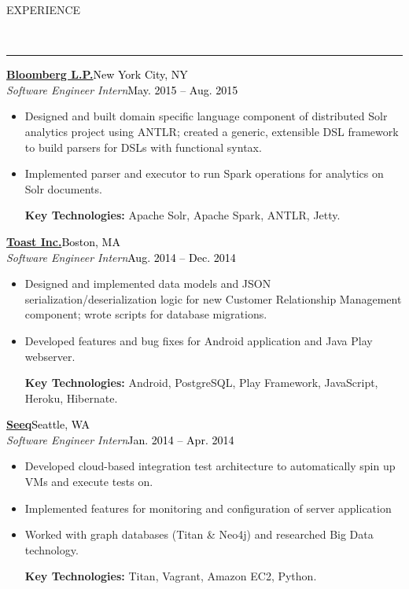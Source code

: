 \documentclass[11pt, letterpaper, oneside]{article}
\newcommand{\HRule}[2]{\textcolor{#1}{\rule{\linewidth}{#2}}}
\newcommand{\sectiontitle}[1]{\begin{minipage}{\textwidth}\vspace{-7.5pt}\begin{flushleft}\hspace{-20.5pt}\vspace{-25pt}
\Large\MakeUppercase{#1}\end{flushleft}\end{minipage}\\\HRule{black}{0.15mm}\vspace{\baselineskip}}
\newenvironment{ressection}[1]{
  \sectiontitle{#1}}
  {\vspace{-\baselineskip}}
\newcommand{\resentryheader}[4]{
    \vspace{-6pt}
    \textbf{#1}\hspace{\stretch{1}}\textcolor{black}{#3}\\
    \textit{#2}\hspace{\stretch{1}}\textcolor{black}{#4}\\
}
\newcommand{\resitem}[1]{
    \vspace{2pt}
    \item \begin{flushleft} #1 \end{flushleft}
}
\newenvironment{resentry}[4]{
  \begin{minipage}{\textwidth}
  \vspace{-3pt}
    \resentryheader{#1}{#2}{#3}{#4}
        \vspace{-\baselineskip}
    \begin{itemize}[noitemsep,nolistsep]
}{
    \end{itemize}
        \vspace{\baselineskip}
        \end{minipage}
}
\begin{document}
\begin{ressection}{Experience}
  \begin{resentry}{\href{http://www.bloomberg.com/professional/}{Bloomberg L.P.}}{Software Engineer Intern}{New York City, NY}{May. 2015 -- Aug. 2015}
    \resitem{Designed and built domain specific language component of distributed Solr analytics project using ANTLR; created a generic, extensible DSL framework to build parsers for DSLs with functional syntax.}
    \resitem{Implemented parser and executor to run Spark operations for analytics on Solr documents.}
    \vspace{2pt} \hspace{-15pt}
    \textbf{Key Technologies:} Apache Solr, Apache Spark, ANTLR, Jetty.
    \vspace{2pt} 
  \end{resentry}  
  \begin{resentry}{\href{http://pos.toasttab.com/}{Toast Inc.}}{Software Engineer Intern}{Boston, MA}{Aug. 2014 -- Dec. 2014}
   \resitem{Designed and implemented data models and JSON serialization/deserialization logic for new Customer Relationship Management component; wrote scripts for database migrations. }
    \resitem{Developed features and bug fixes for Android application and Java Play webserver.}
    \vspace{2pt}  \hspace{-15pt}
    \textbf{Key Technologies:} Android, PostgreSQL, Play Framework, JavaScript, Heroku, Hibernate.
	\vspace{2pt}   
  \end{resentry}  
  \begin{resentry}{\href{http://www.seeq.com/}{Seeq}}{Software Engineer Intern}{Seattle, WA}{Jan. 2014 -- Apr. 2014}
    \resitem{Developed cloud-based integration test architecture to automatically spin up VMs and execute tests on.}
    \resitem{Implemented features for monitoring and configuration of server application}
    \resitem{Worked with graph databases (Titan \& Neo4j) and researched Big Data technology.}
    \vspace{2pt} \hspace{-15pt}
    \textbf{Key Technologies:} Titan, Vagrant, Amazon EC2, Python.
	\vspace{2pt}   
  \end{resentry}
\end{ressection}
\end{document}
